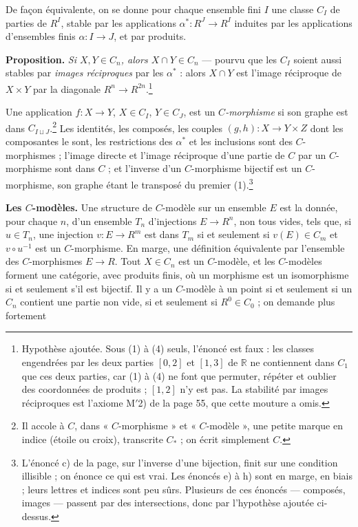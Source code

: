 \documentclass[11pt,a4paper]{article}
\begin{document}
De façon équivalente, on se donne pour chaque ensemble fini $I$ une classe
$C_I$ de parties de $R^I$, stable par les applications $\alpha^* : R^J \to
R^I$ induites par les applications d'ensembles finis $\alpha : I \to J$, et par
produits.

\textbf{Proposition.} \emph{Si $X, Y \in C_n$, alors $X \cap Y \in C_n$} —
pourvu que les $C_I$ soient aussi stables par \emph{images réciproques} par les
$\alpha^*$ : alors $X \cap Y$ est l'image réciproque de $X \times Y$ par la
diagonale $R^n \to R^{2n}$.\footnote{Hypothèse ajoutée. Sous (1) à (4)
seuls, l'énoncé est faux : les classes engendrées par les deux parties
$[0,2]$ et $[1,3]$ de $\mathbb{R}$ ne contiennent dans $C_1$ que ces deux
parties, car (1) à (4) ne font que permuter, répéter et oublier des
coordonnées de produits ; $[1,2]$ n'y est pas. La stabilité par images
réciproques est l'axiome M$'$2) de la page 55, que cette mouture a omis.}

Une application $f : X \to Y$, $X \in C_I$, $Y \in C_J$, est un
\emph{$C$-morphisme} si son graphe est dans $C_{I \sqcup J}$.\footnote{Il
accole à $C$, dans « $C$-morphisme » et « $C$-modèle », une petite marque en
indice (étoile ou croix), transcrite $C_*$ ; on écrit simplement $C$.} Les
identités, les composés, les couples $(g, h) : X \to Y \times Z$ dont les
composantes le sont, les restrictions des $\alpha^*$ et les inclusions sont des
$C$-morphismes ; l'image directe et l'image réciproque d'une partie de $C$ par
un $C$-morphisme sont dans $C$ ; et l'inverse d'un $C$-morphisme bijectif est
un $C$-morphisme, son graphe étant le transposé du premier
(1).\footnote{L'énoncé c) de la page, sur l'inverse d'une bijection, finit sur
une condition illisible ; on énonce ce qui est vrai. Les énoncés e) à h) sont
en marge, en biais ; leurs lettres et indices sont peu sûrs. Plusieurs de ces
énoncés — composés, images — passent par des intersections, donc par
l'hypothèse ajoutée ci-dessus.}

\textbf{Les $C$-modèles.} Une structure de $C$-modèle sur un ensemble $E$ est
la donnée, pour chaque $n$, d'un ensemble $T_n$ d'injections $E \to R^n$, non
tous vides, tels que, si $u \in T_n$, une injection $v : E \to R^m$ est dans
$T_m$ si et seulement si $v(E) \in C_m$ et $v \circ u^{-1}$ est un
$C$-morphisme. En marge, une définition équivalente par l'ensemble des
$C$-morphismes $E \to R$. Tout $X \in C_n$ est un $C$-modèle, et les
$C$-modèles forment une catégorie, avec produits finis, où un morphisme est un
isomorphisme si et seulement s'il est bijectif. Il y a un $C$-modèle à un
point si et seulement si un $C_n$ contient une partie non vide, si et seulement
si $R^0 \in C_0$ ; on demande plus fortement
\end{document}
